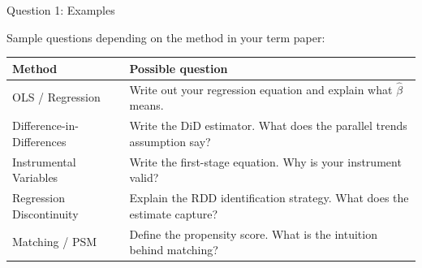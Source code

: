 \documentclass[dvipsnames,hyperref={pdfpagelabels=false}]{beamer}
\begin{document}
\begin{frame}{Question 1: Examples}

\vspace{0.1cm}
\small
Sample questions depending on the method in your term paper:

\vspace{0.3cm}
\begin{tabular}{p{} p{}}
\toprule
\textbf{Method} & \textbf{Possible question} \\
\midrule
OLS / Regression &
Write out your regression equation and explain what $\hat{\beta}$ means. \\[6pt]
Difference-in-Differences &
Write the DiD estimator. What does the parallel trends assumption say? \\[6pt]
Instrumental Variables &
Write the first-stage equation. Why is your instrument valid? \\[6pt]
Regression Discontinuity &
Explain the RDD identification strategy. What does the estimate capture? \\[6pt]
Matching / PSM &
Define the propensity score. What is the intuition behind matching? \\
\bottomrule
\end{tabular}

\end{frame}
\end{document}
